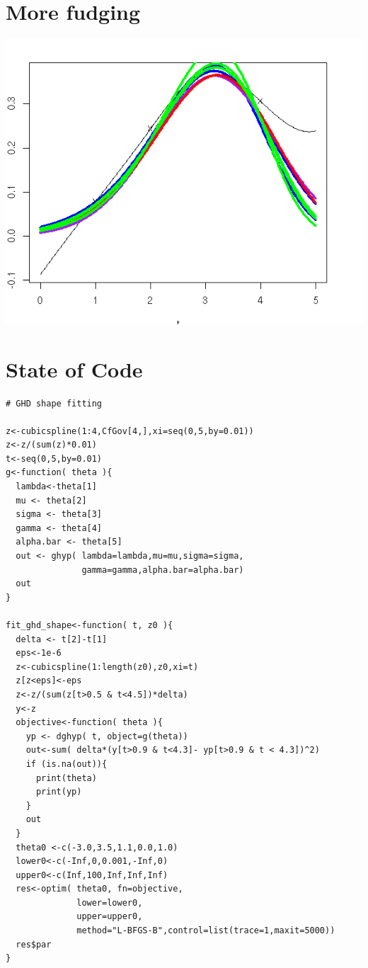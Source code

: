 \documentclass{amsart}
\begin{document}
\section{More fudging}

\includegraphics[scale=0.8]{fit2_cfgovt5.png}


\section{State of Code}

\begin{verbatim}
# GHD shape fitting

z<-cubicspline(1:4,CfGov[4,],xi=seq(0,5,by=0.01))
z<-z/(sum(z)*0.01)
t<-seq(0,5,by=0.01)
g<-function( theta ){
  lambda<-theta[1]
  mu <- theta[2]
  sigma <- theta[3]
  gamma <- theta[4]
  alpha.bar <- theta[5]
  out <- ghyp( lambda=lambda,mu=mu,sigma=sigma,
               gamma=gamma,alpha.bar=alpha.bar)
  out
}

fit_ghd_shape<-function( t, z0 ){
  delta <- t[2]-t[1]
  eps<-1e-6
  z<-cubicspline(1:length(z0),z0,xi=t)
  z[z<eps]<-eps
  z<-z/(sum(z[t>0.5 & t<4.5])*delta)
  y<-z
  objective<-function( theta ){
    yp <- dghyp( t, object=g(theta))
    out<-sum( delta*(y[t>0.9 & t<4.3]- yp[t>0.9 & t < 4.3])^2)
    if (is.na(out)){
      print(theta)
      print(yp)    
    }
    out
  }
  theta0 <-c(-3.0,3.5,1.1,0.0,1.0)
  lower0<-c(-Inf,0,0.001,-Inf,0)
  upper0<-c(Inf,100,Inf,Inf,Inf)
  res<-optim( theta0, fn=objective,
              lower=lower0,
              upper=upper0,
              method="L-BFGS-B",control=list(trace=1,maxit=5000))
  res$par
}
\end{verbatim}
\end{document}
